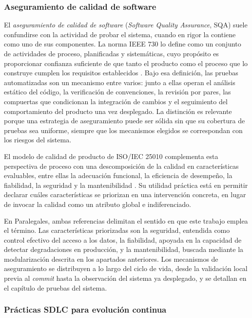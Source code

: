 \subsubsection{Aseguramiento de calidad de software}

El \textit{aseguramiento de calidad de software} (\textit{Software Quality Assurance}, SQA) suele confundirse con la actividad de probar el sistema, cuando en rigor la contiene como uno de sus componentes. La norma IEEE 730 lo define como un conjunto de actividades de proceso, planificadas y sistemáticas, cuyo propósito es proporcionar confianza suficiente de que tanto el producto como el proceso que lo construye cumplen los requisitos establecidos \cite{IEEE730}. Bajo esa definición, las pruebas automatizadas son un mecanismo entre varios: junto a ellas operan el análisis estático del código, la verificación de convenciones, la revisión por pares, las compuertas que condicionan la integración de cambios y el seguimiento del comportamiento del producto una vez desplegado. La distinción es relevante porque una estrategia de aseguramiento puede ser sólida sin que su cobertura de pruebas sea uniforme, siempre que los mecanismos elegidos se correspondan con los riesgos del sistema.

El modelo de calidad de producto de ISO/IEC 25010 complementa esta perspectiva de proceso con una descomposición de la calidad en características evaluables, entre ellas la adecuación funcional, la eficiencia de desempeño, la fiabilidad, la seguridad y la mantenibilidad \cite{ISO25010}. Su utilidad práctica está en permitir declarar cuáles características se priorizan en una intervención concreta, en lugar de invocar la calidad como un atributo global e indiferenciado.

En Paralegales, ambas referencias delimitan el sentido en que este trabajo emplea el término. Las características priorizadas son la seguridad, entendida como control efectivo del acceso a los datos, la fiabilidad, apoyada en la capacidad de detectar degradaciones en producción, y la mantenibilidad, buscada mediante la modularización descrita en los apartados anteriores. Los mecanismos de aseguramiento se distribuyen a lo largo del ciclo de vida, desde la validación local previa al \textit{commit} hasta la observación del sistema ya desplegado, y se detallan en el capítulo de pruebas del sistema.

\subsubsection{Prácticas SDLC para evolución continua}

